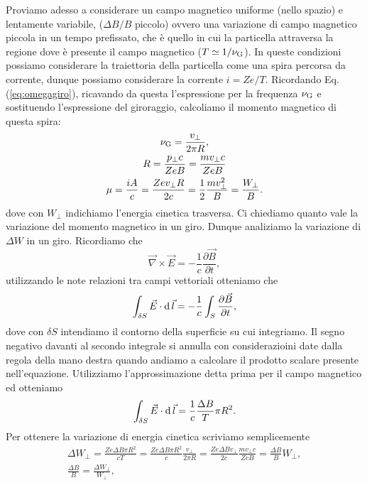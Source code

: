 Proviamo adesso a considerare un campo magnetico uniforme (nello spazio) e lentamente variabile, ($\Delta B / B$ piccolo) ovvero una variazione di campo magnetico piccola in un tempo prefissato, che è quello in cui la particella attraversa la regione dove è presente il campo magnetico ($T \simeq 1 / \nu_\textup{G}$). In queste condizioni possiamo considerare la traiettoria della particella come una spira percorsa da corrente, dunque possiamo considerare la corrente $i = Ze / T$. Ricordando Eq.(\ref{eq:omegagiro}), ricavando da questa l'espressione per la frequenza $\nu_\textup{G}$ e sostituendo l'espressione del giroraggio, calcoliamo il momento magnetico di questa spira:
\begin{gather}
    \nu_\textup{G} = \frac{v_\bot}{2\pi R}, \notag \\
    R = \frac{p_\bot c}{ZeB} = \frac{m v_\bot c}{ZeB} \notag \\
    \mu = \frac{iA}{c} = \frac{Ze v_\bot R}{2c} = \frac{1}{2}\frac{mv_\bot^2}{B} = \frac{W_\bot}{B}. \label{eq:mu_spira}
\end{gather}
dove con $W_\bot$ indichiamo l'energia cinetica trasversa. Ci chiediamo quanto vale la variazione del momento magnetico in un giro. Dunque analiziamo la variazione di $\Delta W$ in un giro. Ricordiamo che
\begin{equation*}
    \vec{\nabla} \times \vec{E} = -\frac{1}{c} \frac{\partial \vec{B}}{\partial t},
\end{equation*}
utilizzando le note relazioni tra campi vettoriali otteniamo che 
\begin{equation*}
    \int_{\delta S} \vec{E} \cdot \operatorname{d} \vec{l} = -\frac{1}{c} \int_{S} \frac{\partial \vec{B}}{\partial t},
\end{equation*}
dove con $\delta S$ intendiamo il contorno della superficie su cui integriamo. Il segno negativo davanti al secondo integrale si annulla con considerazioini date dalla regola della mano destra quando andiamo a calcolare il prodotto scalare presente nell'equazione. Utilizziamo l'approssimazione detta prima per il campo magnetico ed otteniamo
\begin{equation*}
    \int_{\delta S} \vec{E} \cdot \operatorname{d} \vec{l} = \frac{1}{c}\frac{\Delta B}{T} \pi R^2.
\end{equation*}
Per ottenere la variazione di energia cinetica scriviamo semplicemente
\begin{gather*}
    \Delta W_\bot = \frac{Ze \Delta B \pi R^2}{cT} = \frac{Ze \Delta B \pi R^2}{c} \frac{v_\bot}{2\pi R} = \frac{Ze\Delta B v_\bot}{2c} \frac{mv_\bot c}{ZeB} = \frac{\Delta B}{B} W_\bot,\\
    \frac{\Delta B}{B} = \frac{\Delta W_\bot}{W_\bot},
\end{gather*}
